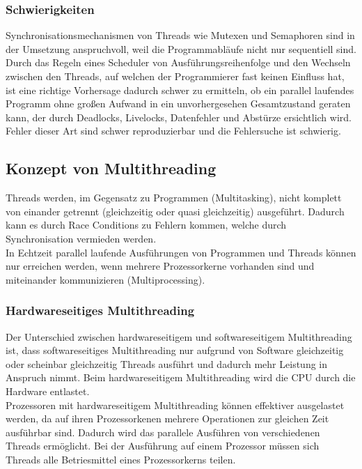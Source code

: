 \documentclass[12pt,a4paper]{report}
\begin{document}
\begin{onehalfspace}
\subsubsection{Schwierigkeiten}
Synchronisationsmechanismen von Threads wie Mutexen und Semaphoren sind in der Umsetzung anspruchvoll, weil die Programmabläufe nicht nur sequentiell sind. Durch das Regeln eines Scheduler von Ausführungsreihenfolge und den Wechseln zwischen den Threads, auf welchen der Programmierer fast keinen Einfluss hat, ist eine richtige Vorhersage dadurch schwer zu ermitteln, ob ein parallel laufendes Programm ohne großen Aufwand in ein unvorhergesehen Gesamtzustand geraten kann, der durch Deadlocks, Livelocks, Datenfehler und Abstürze ersichtlich wird.\\
Fehler dieser Art sind schwer reproduzierbar und die Fehlersuche ist schwierig.


\subsection{Konzept von Multithreading}
Threads werden, im Gegensatz zu Programmen (Multitasking), nicht komplett von einander getrennt (gleichzeitig oder quasi gleichzeitig) ausgeführt. Dadurch kann es durch Race Conditions zu Fehlern kommen, welche durch Synchronisation vermieden werden.\\ 
In Echtzeit parallel laufende Ausführungen von Programmen und Threads können nur erreichen werden, wenn mehrere Prozessorkerne vorhanden sind und miteinander kommunizieren (Multiprocessing).

\subsubsection{Hardwareseitiges Multithreading}
Der Unterschied zwischen hardwareseitigem und softwareseitigem Multithreading ist, dass softwareseitiges Multithreading nur aufgrund von Software gleichzeitig oder scheinbar gleichzeitig Threads ausführt und dadurch mehr Leistung in Anspruch nimmt. Beim hardwareseitigem  Multithreading wird die CPU durch die Hardware entlastet.\\

Prozessoren mit hardwareseitigem Multithreading können effektiver ausgelastet werden, da auf ihren Prozessorkenen mehrere Operationen zur gleichen Zeit ausführbar sind. Dadurch wird das parallele Ausführen von verschiedenen Threads ermöglicht. Bei der Ausführung auf einem Prozessor müssen sich Threads alle Betriesmittel eines Prozessorkerns teilen.\\


\end{onehalfspace}
\end{document}
